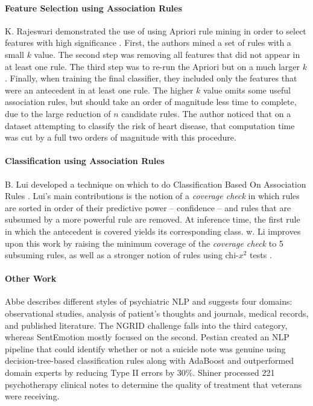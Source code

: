 \paragraph{Feature Selection using Association Rules} K. Rajeswari demonstrated the use of using \textsf{Apriori} rule mining in order to select features with high significance \cite{rajeswari}. First, the authors mined a set of rules with a small $k$ value. The second step was removing all features that did not appear in at least one rule. The third step was to re-run the \textsf{Apriori} but on a much larger $k$. Finally, when training the final classifier, they included only the features that were an antecedent in at least one rule. The higher $k$ value omits some useful association rules, but should take an order of magnitude less time to complete, due to the large reduction of $n$ candidate rules. The author noticed that on a dataset attempting to classify the risk of heart disease, that computation time was cut by a full two orders of magnitude with this procedure.

\paragraph{Classification using Association Rules} B. Lui developed a technique on which to do Classification Based On Association Rules \cite{cba}. Lui's main contributions is the notion of a \textit{coverage check} in which rules are sorted in order of their predictive power -- confidence -- and rules that are subsumed by a more powerful rule are removed. At inference time, the first rule in which the antecedent is covered yields its corresponding class. w. Li improves upon this work by raising the minimum coverage of the \textit{coverage check} to 5 subsuming rules, as well as a stronger notion of rules using chi-$x^2$ tests \cite{cmar}. 

\paragraph{Other Work} Abbe \cite{abbe} describes different styles of psychiatric NLP and suggests four domains: observational studies, analysis of patient's thoughts and journals, medical records, and published literature. The NGRID challenge falls into the third category, whereas SentEmotion mostly focused on the second. Pestian \cite{pestian} created an NLP pipeline that could identify whether or not a suicide note was genuine using decision-tree-based classification rules along with AdaBoost and outperformed domain experts by reducing Type II errors by 30\%. Shiner \cite{shiner} processed 221 psychotherapy clinical notes to determine the quality of treatment that veterans were receiving. 

